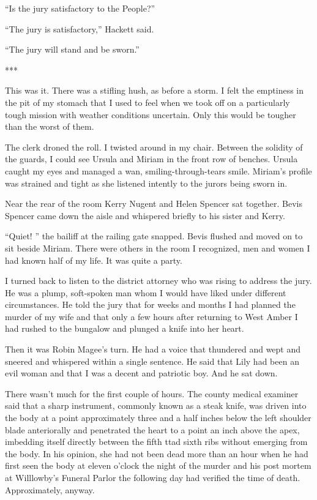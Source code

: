 \documentclass{novel}
\begin{document}
{“Is the jury satisfactory to the People?”

“The jury is satisfactory,” Hackett said.

“The jury will stand and be sworn.”

***

This was it. There was a stifling hush, as before a storm. I felt the emptiness in the pit of my stomach that I used to feel when we took off on a particularly tough mission with weather conditions uncertain. Only this would be tougher than the worst of them.

The clerk droned the roll. I twisted around in my chair. Between the solidity of the guards, I could see Ursula and Miriam in the front row of benches. Ursula caught my eyes and managed a wan, smiling-through-tears smile. Miriam’s profile was strained and tight as she listened intently to the jurors being sworn in.

Near the rear of the room Kerry Nugent and Helen Spencer sat together. Bevis Spencer came down the aisle and whispered briefly to his sister and Kerry.

“Quiet! ” the bailiff at the railing gate snapped. Bevis flushed and moved on to sit beside Miriam. There were others in the room I recognized, men and women I had known half of my life. It was quite a party.

I turned back to listen to the district attorney who was rising to address the jury. He was a plump, soft-spoken man whom I would have liked under different circumstances. He told the jury that for weeks and months I had planned the murder of my wife and that only a few hours after returning to West Amber I had rushed to the bungalow and plunged a knife into her heart.

Then it was Robin Magee’s turn. He had a voice that thundered and wept and sneered and whispered within a single sentence. He said that Lily had been an evil woman and that I was a decent and patriotic boy. And he sat down.

There wasn’t much for the first couple of hours. The county medical examiner said that a sharp instrument, commonly known as a steak knife, was driven into the body at a point approximately three and a half inches below the left shoulder blade anteriorally and penetrated the heart to a point an inch above the apex, imbedding itself directly between the fifth ttad sixth ribs without emerging from the body. In his opinion, she had not been dead more than an hour when he had first seen the body at eleven o’clock the night of the murder and his post mortem at Willlowby’s Funeral Parlor the following day had verified the time of death. Approximately, anyway.

}
\end{document}
